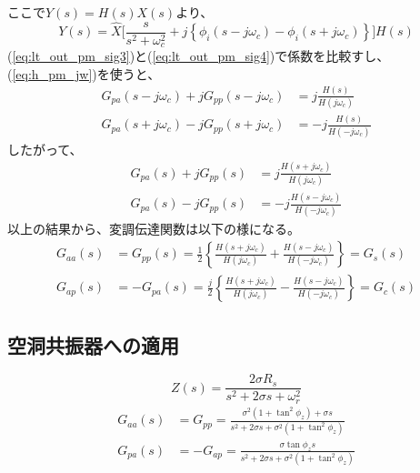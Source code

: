 \documentclass[book]{jlreq}
\begin{document}
%
ここで$Y(s) = H(s) X(s)$より、
%
\begin{equation}
    Y(s) = \hat{X} \biggl [\frac{s}{s^2+\omega_c^2}
        + j \left \{\phi_i(s - j\omega_c) - \phi_i(s+j\omega_c)\right \}  \biggr ] H(s)
    \label{eq:lt_out_pm_sig4}
\end{equation}
%
(\ref{eq:lt_out_pm_sig3})と(\ref{eq:lt_out_pm_sig4})で係数を比較すし、(\ref{eq:h_pm_jw})を使うと、
%
\begin{equation}
    \begin{split}
        G_{pa}(s-j\omega_c) + j G_{pp}(s-j\omega_c) &= j \frac{H(s)}{H(j\omega_c)} \\
        G_{pa}(s+j\omega_c) - j G_{pp}(s+j\omega_c) &= -j \frac{H(s)}{H(-j\omega_c)}
    \end{split}
\end{equation}
%
したがって、
%
\begin{equation}
    \begin{split}
        G_{pa}(s) + j G_{pp}(s) &= j \frac{H(s+j\omega_c)}{H(j\omega_c)} \\
        G_{pa}(s) - j G_{pp}(s) &= -j \frac{H(s-j\omega_c)}{H(-j\omega_c)}
    \end{split}
\end{equation}
%
以上の結果から、変調伝達関数は以下の様になる。
%
\begin{equation}
    \begin{split}
        G_{aa}(s) &= G_{pp}(s)
        = \frac{1}{2}\left\{\frac{H(s+j\omega_c)}{H(j\omega_c)} + \frac{H(s-j\omega_c)}{H(-j\omega_c)}\right\} = G_s(s)\\
        G_{ap}(s) &= -G_{pa}(s)
        = \frac{j}{2}\left\{\frac{H(s+j\omega_c)}{H(j\omega_c)} - \frac{H(s-j\omega_c)}{H(-j\omega_c)}\right\} = G_c(s)
    \end{split}
\end{equation}
%
\subsection{空洞共振器への適用}
%
\begin{equation}
    Z(s) = \frac{2\sigma R_s}{s^2+2\sigma s + \omega_r^2}
\end{equation}
%
\begin{align}
    G_{aa}(s) & = G_{pp} = \frac{\sigma^2(1+\tan^2\phi_z)+\sigma s}{s^2+2\sigma s + \sigma^2(1+\tan^2\phi_z)} \\
    G_{pa}(s) & = - G_{ap} = \frac{\sigma\tan\phi_z s}{s^2+2\sigma s + \sigma^2(1+\tan^2\phi_z)}
\end{align}
%
\end{document}
